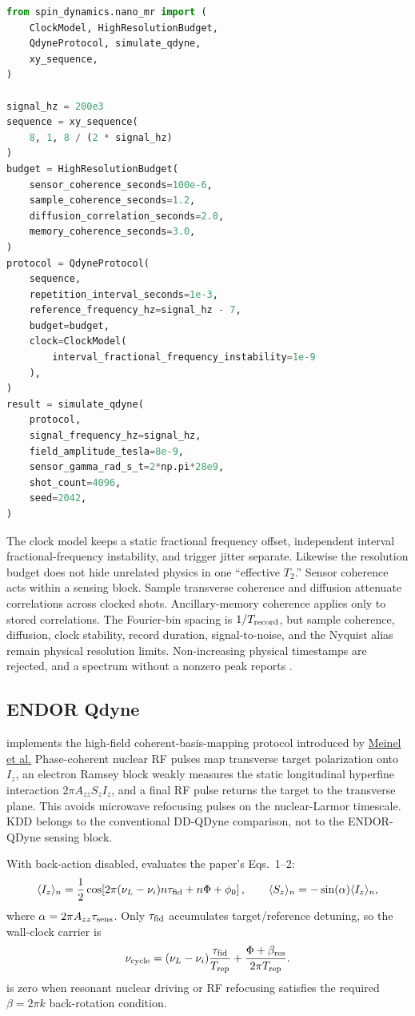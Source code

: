 \begin{lstlisting}[language=Python]
from spin_dynamics.nano_mr import (
    ClockModel, HighResolutionBudget,
    QdyneProtocol, simulate_qdyne,
    xy_sequence,
)

signal_hz = 200e3
sequence = xy_sequence(
    8, 1, 8 / (2 * signal_hz)
)
budget = HighResolutionBudget(
    sensor_coherence_seconds=100e-6,
    sample_coherence_seconds=1.2,
    diffusion_correlation_seconds=2.0,
    memory_coherence_seconds=3.0,
)
protocol = QdyneProtocol(
    sequence,
    repetition_interval_seconds=1e-3,
    reference_frequency_hz=signal_hz - 7,
    budget=budget,
    clock=ClockModel(
        interval_fractional_frequency_instability=1e-9
    ),
)
result = simulate_qdyne(
    protocol,
    signal_frequency_hz=signal_hz,
    field_amplitude_tesla=8e-9,
    sensor_gamma_rad_s_t=2*np.pi*28e9,
    shot_count=4096,
    seed=2042,
)
\end{lstlisting}

The clock model keeps a static fractional frequency offset, independent
interval fractional-frequency instability, and trigger jitter separate.
Likewise the resolution budget does not hide unrelated physics in one
``effective \(T_2\).'' Sensor coherence acts within a sensing block. Sample
transverse coherence and diffusion attenuate correlations across clocked
shots. Ancillary-memory coherence applies only to stored correlations.
The Fourier-bin spacing is \(1/T_{\rm record}\), but sample coherence,
diffusion, clock stability, record duration, signal-to-noise, and the Nyquist
alias remain physical resolution limits. Non-increasing physical timestamps
are rejected, and a spectrum without a nonzero peak reports .

\subsection{ENDOR Qdyne}
 implements the high-field coherent-basis-mapping
protocol introduced by
\href{https://doi.org/10.1038/s42005-023-01419-2}{Meinel et al.}
Phase-coherent nuclear RF pulses map transverse target polarization onto
\(I_z\), an electron Ramsey block weakly measures the static longitudinal
hyperfine interaction \(2\pi A_{zz}S_zI_z\), and a final RF pulse returns the
target to the transverse plane. This avoids microwave refocusing pulses on the
nuclear-Larmor timescale. KDD belongs to the conventional DD-QDyne comparison,
not to the ENDOR-QDyne sensing block.

With back-action disabled,  evaluates the paper's
Eqs.~1--2:
\[
 \langle I_z\rangle_n =
 \frac12\cos\!\left[
 2\pi(\nu_L-\nu_i)n\tau_{\rm fid}+n\Phi+\phi_0
 \right],
 \qquad
 \langle S_z\rangle_n=-\sin(\alpha)\langle I_z\rangle_n ,
\]
where \(\alpha=2\pi A_{zz}\tau_{\rm sens}\). Only \(\tau_{\rm fid}\)
accumulates target/reference detuning, so the wall-clock carrier is
\[
 \nu_{\rm cycle} =
 (\nu_L-\nu_i)\frac{\tau_{\rm fid}}{T_{\rm rep}}
 +\frac{\Phi+\beta_{\rm res}}{2\pi T_{\rm rep}} .
\]
 is zero when resonant nuclear driving or
RF refocusing satisfies the required \(\beta=2\pi k\) back-rotation condition.

